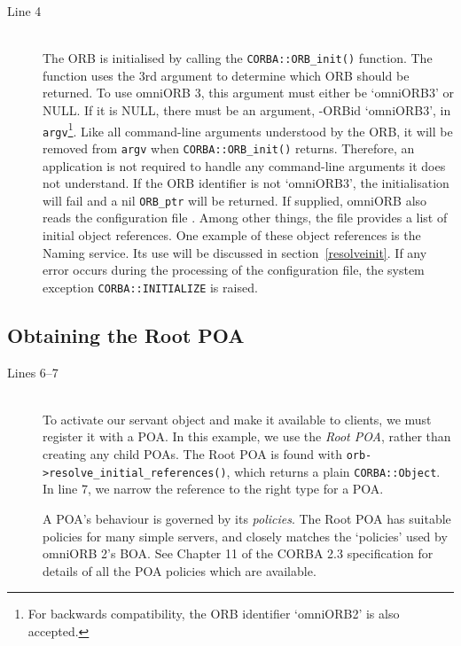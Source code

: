 \documentclass[11pt,twoside,a4paper]{book}
\newcommand{\type}[1]{\texttt{#1}}
\newcommand{\code}[1]{\texttt{#1}}
\newcommand{\op}[1]{\texttt{#1()}}
\newcommand{\term}[1]{\textit{#1}}
\newcommand{\file}{\begingroup \urlstyle{tt}\Url}
\newcommand{\dsc}{\discretionary{}{}{}}
\begin{document}
\begin{description}

\item[Line 4]\mbox{}\\
%
The ORB is initialised by calling the \op{CORBA::ORB\_init}
function. The function uses the 3rd argument to determine which ORB
should be returned. To use omniORB 3, this argument must either be
`omniORB3' or NULL. If it is NULL, there must be an argument, -ORBid
`omniORB3', in \code{argv}\footnote{For backwards compatibility, the
ORB identifier `omniORB2' is also accepted.}. Like all command-line
arguments understood by the ORB, it will be removed from \code{argv}
when \op{CORBA::ORB\_init} returns. Therefore, an application is not
required to handle any command-line arguments it does not
understand. If the ORB identifier is not `omniORB3', the
initialisation will fail and a nil \type{ORB\_ptr} will be returned.
If supplied, omniORB also reads the configuration file
\file{omniORB.cfg}. Among other things, the file provides a list of
initial object references. One example of these object references is
the Naming service. Its use will be discussed in
section~\ref{resolveinit}. If any error occurs during the processing
of the configuration file, the system exception
\code{CORBA::INITIALIZE} is raised.

\end{description}


\subsection{Obtaining the Root POA}

\begin{description}

\item[Lines 6--7]\mbox{}\\
%
To activate our servant object and make it available to clients, we
must register it with a POA. In this example, we use the \term{Root
POA}, rather than creating any child POAs. The Root POA is found with
\op{orb->resolve\_initial\_\dsc{}references}, which returns a plain
\type{CORBA::Object}. In line 7, we narrow the reference to the right
type for a POA.

A POA's behaviour is governed by its \term{policies}. The Root POA has
suitable policies for many simple servers, and closely matches the
`policies' used by omniORB 2's BOA. See Chapter 11 of the CORBA 2.3
specification\cite{corba23-spec} for details of all the POA policies
which are available.

\end{description}
\end{document}
